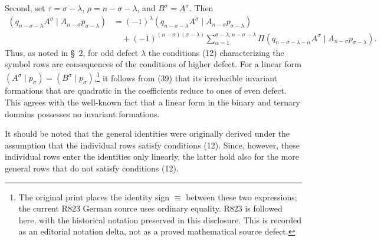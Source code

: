 \documentclass[10pt]{article}
\newcommand{\pair}[2]{(#1\mid #2)}
\begin{document}
Second, set $\tau=\sigma-\lambda$, $\rho=n-\sigma-\lambda$, and
$B^\sigma=A^\sigma$. Then
\begin{equation}
\begin{aligned}
\pair{q_{n-\sigma-\lambda}A^\sigma}
{A_{n-\sigma}p_{\sigma-\lambda}}
&=(-1)^\lambda\pair{q_{n-\sigma-\lambda}A^\sigma}
{A_{n-\sigma}p_{\sigma-\lambda}}\\
&\quad+(-1)^{(n-\sigma)(\sigma-\lambda)}
 \sum_{\alpha=1}^{\sigma-\lambda,n-\sigma-\lambda}
 \Pi\pair{q_{n-\sigma-\lambda-\alpha}A^\sigma}
 {A_{n-\sigma}p_{\sigma-\lambda}}.
\end{aligned}
\tag{39}
\end{equation}
Thus, as noted in \S\ 2, for odd defect $\lambda$ the conditions (12)
characterizing the symbol rows are consequences of the conditions of higher
defect. For a linear form
$\pair{A^\sigma}{p_\sigma}=\pair{B^\sigma}{p_\sigma}$,\footnote{The original
print places the identity sign $\equiv$ between these two expressions; the
current R823 German source uses ordinary equality. R823 is followed here, with
the historical notation preserved in this disclosure. This is recorded as an
editorial notation delta, not as a proved mathematical source defect.} it follows from (39)
that its irreducible invariant formations that are quadratic in the
coefficients reduce to ones of even defect. This agrees with the well-known
fact that a linear form in the binary and ternary domains possesses no
invariant formations.

It should be noted that the general identities were originally derived under
the assumption that the individual rows satisfy conditions (12). Since,
however, these individual rows enter the identities only linearly, the latter
hold also for the more general rows that do not satisfy conditions (12).
\end{document}
